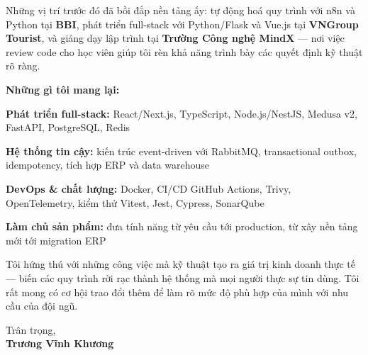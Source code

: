 \documentclass[10pt, letterpaper]{article}
\begin{document}
\begin{onecolentry}
Những vị trí trước đó đã bồi đắp nền tảng ấy: tự động hoá quy trình với n8n và Python tại \textbf{BBI}, phát triển full-stack với Python/Flask và Vue.js tại \textbf{VNGroup Tourist}, và giảng dạy lập trình tại \textbf{Trường Công nghệ MindX} --- nơi việc review code cho học viên giúp tôi rèn khả năng trình bày các quyết định kỹ thuật rõ ràng.

\vspace{0.2cm}

\textbf{Những gì tôi mang lại:}

\vspace{0.1cm}

\begin{highlights}
    \item \textbf{Phát triển full-stack:} React/Next.js, TypeScript, Node.js/NestJS, Medusa v2, FastAPI, PostgreSQL, Redis
    \item \textbf{Hệ thống tin cậy:} kiến trúc event-driven với RabbitMQ, transactional outbox, idempotency, tích hợp ERP và data warehouse
    \item \textbf{DevOps \& chất lượng:} Docker, CI/CD GitHub Actions, Trivy, OpenTelemetry, kiểm thử Vitest, Jest, Cypress, SonarQube
    \item \textbf{Làm chủ sản phẩm:} đưa tính năng từ yêu cầu tới production, từ xây nền tảng mới tới migration ERP
\end{highlights}

\vspace{0.2cm}

Tôi hứng thú với những công việc mà kỹ thuật tạo ra giá trị kinh doanh thực tế --- biến các quy trình rời rạc thành hệ thống mà mọi người thực sự tin dùng. Tôi rất mong có cơ hội trao đổi thêm để làm rõ mức độ phù hợp của mình với nhu cầu của đội ngũ.

\vspace{0.4cm}

Trân trọng,\\
\textbf{Trương Vĩnh Khương}

\end{onecolentry}
\end{document}
